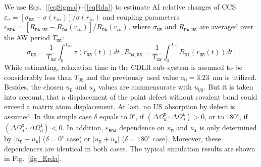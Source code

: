 \documentclass[aip,jap, amsmath,amssymb,reprint]{revtex4-1}
\begin{document}
We use Eqs.~(\ref{eqSigma})--(\ref{eqRda}) to estimate AI relative changes of CCS
$\varepsilon_\sigma=[\sigma_{\mathtt{US}}-\sigma(r_{in})]/\sigma(r_{in})$
and coupling parameters $\varepsilon_{\mathtt{RDA}}=[R_{\mathtt{DA,US}}-R_\mathtt{DA}(r_{in})]/R_\mathtt{DA}(r_{in})$,
where $\sigma_{\mathtt{US}}$ and $R_{\mathtt{DA,US}}$ are averaged over the AW period $T_\mathtt{US}$:
\begin{equation*}
\label{eqAver}
\sigma_{\mathtt{US}}=\frac{1}{T_\mathtt{US}}\int^{T_\mathtt{US}}_0\!\!\!\!\!\!\sigma(r_\mathtt{US}(t))dt\,,
R_{\mathtt{DA,US}}=\frac{1}{T_\mathtt{US}}\int^{T_\mathtt{US}}_0\!\!\!\!\!\!R_{\mathtt{DA}}(r_\mathtt{US}(t))dt\,.
\end{equation*}
While estimating, relaxation time in the CDLR sub--system is assumed to be considerably less than $T_\mathtt{US}$
and the previously used\cite{CDLR:JAP} value $a_0=3.23$~nm is utilized.
Besides, the chosen $u_\mathtt{D}$ and $u_\mathtt{A}$ values are commensurate with $u_\mathtt{US}$.
But it is taken into account, that a displacement of the point defect without covalent bond could exceed a matrix atom displacement.
At last, no US  absorption by defect is assumed.
In this simple case $\delta$ equals to $0^\circ$, if $(\Delta\Omega_d^\mathtt{D}\cdot\Delta\Omega_d^\mathtt{A})>0$,
or to $180^\circ$, if $(\Delta\Omega_d^\mathtt{D}\cdot\Delta\Omega_d^\mathtt{A})<0$.
In addition, $\varepsilon_{\mathtt{RDA}}$ dependence on
$u_\mathtt{D}$ and $u_\mathtt{A}$
is only determined by $|u_\mathtt{D}-u_\mathtt{A}|$ ($\delta=0^\circ$ case) or $|u_\mathtt{D}+u_\mathtt{A}|$ ($\delta=180^\circ$ case).
Moreover, these dependences are identical in both cases.
The typical simulation results are shown in  Fig.~\ref{fig_Erda}.

\end{document}
